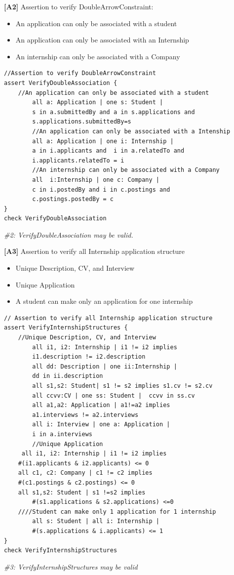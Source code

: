\pagebreak
\textbf{[A2]} Assertion to verify DoubleArrowConstraint:
\begin{itemize}
    \item An application can only be associated with a student
    \item An application can only be associated with an Internship
    \item An internship can only be associated with a Company
\end{itemize}
\begin{lstlisting}
//Assertion to verify DoubleArrowConstraint
assert VerifyDoubleAssociation {
	//An application can only be associated with a student
    	all a: Application | one s: Student | 
    	s in a.submittedBy and a in s.applications and
    	s.applications.submittedBy=s
    	//An application can only be associated with a Intenship
    	all a: Application | one i: Internship | 
    	a in i.applicants and  i in a.relatedTo and
    	i.applicants.relatedTo = i
    	//An internship can only be associated with a Company
    	all  i:Internship | one c: Company | 
    	c in i.postedBy and i in c.postings and 
    	c.postings.postedBy = c  
}
check VerifyDoubleAssociation
\end{lstlisting}
\textit{\#2: VerifyDoubleAssociation may be valid.}

\pagebreak
\textbf{[A3]} Assertion to verify all Internship application structure
\begin{itemize}
    \item Unique Description, CV, and Interview 
    \item Unique Application
    \item A student can make only an application for one internship
\end{itemize}
\begin{lstlisting}
// Assertion to verify all Internship application structure
assert VerifyInternshipStructures {
	//Unique Description, CV, and Interview 
    	all i1, i2: Internship | i1 != i2 implies 
		i1.description != i2.description
    	all dd: Description | one ii:Internship | 
		dd in ii.description
    	all s1,s2: Student| s1 != s2 implies s1.cv != s2.cv
    	all ccvv:CV | one ss: Student |  ccvv in ss.cv
    	all a1,a2: Application | a1!=a2 implies 
		a1.interviews != a2.interviews
    	all i: Interview | one a: Application |
		i in a.interviews
    	//Unique Application
   	 all i1, i2: Internship | i1 != i2 implies 
   	#(i1.applicants & i2.applicants) <= 0
   	all c1, c2: Company | c1 != c2 implies 
   	#(c1.postings & c2.postings) <= 0
   	all s1,s2: Student | s1 !=s2 implies 
    	#(s1.applications & s2.applications) <=0
   	////Student can make only 1 application for 1 internship
    	all s: Student | all i: Internship | 
    	#(s.applications & i.applicants) <= 1
}
check VerifyInternshipStructures
\end{lstlisting}
\textit{\#3: VerifyInternshipStructures may be valid}

